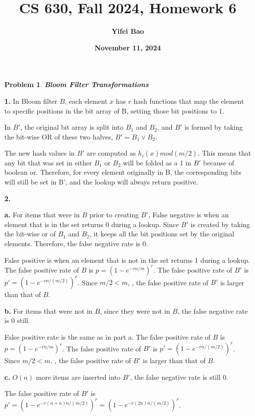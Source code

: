 \documentclass[11pt]{exam}
\title{\Large{\textbf{CS 630, Fall 2024, Homework 6}}}
\author{\textbf{Yifei Bao}}
\date{\textbf{November 11, 2024}}
\newtheorem{problem}{Problem}
\begin{document}
\maketitle

\begin{problem}
    \textbf{Bloom Filter Transformations} 
\end{problem} 

\noindent\textbf{1.}
In Bloom filter $B$, each element $x$ has $r$ hash functions that map the element to specific positions in the bit array of B, setting those bit positions to 1.

In $B'$, the original bit array is split into $B_1$ and $B_2$, and $B'$ is formed by taking the bit-wise OR of these two halves, $B' = B_1 \lor B_2$.

The new hash values in $B'$ are computed as $h_i(x) mod (m/2)$. This means that any bit that was set in either $B_1$ or $B_2$ will be folded as a 1 in $B'$ because of boolean or. Therefore, for every element originally in B, the corresponding bits will still be set in B', and the lookup will always return positive.

\noindent\textbf{2.}

\noindent\textbf{a.}
For items that were in $B$ prior to creating $B'$,
False negative is when an element that is in the set returns 0 during a lookup. Since $B'$ is created by taking the bit-wise or of $B_1$ and $B_2$, it keeps all the bit positions set by the original elements. Therefore, the false negative rate is 0.

False positive is when an element that is not in the set returns 1 during a lookup. The false positive rate of $B$ is $p = (1 - e^{-rn/m})^r$. The false positive rate of $B'$ is $p' = (1 - e^{-rn/(m/2)})^r$. Since $m/2 < m$, , the false positive rate of $B'$ is larger than that of $B$.

\noindent\textbf{b.}
For items that were not in $B$, since they were not in $B$, the false negative rate is 0 still. 

False positive rate is the same as in part a. The false positive rate of $B$ is $p = (1 - e^{-rn/m})^r$. The false positive rate of $B'$ is $p' = (1 - e^{-rn/(m/2)})^r$. Since $m/2 < m$, , the false positive rate of $B'$ is larger than that of $B$.

\noindent\textbf{c.}
$O(n)$ more items are inserted into $B'$, the false negative rate is still 0. 

The false positive rate of $B'$ is $p' = (1 - e^{-r(n+n)n/(m/2)})^r = (1 - e^{-r(2n)n/(m/2)})^r$.
\end{document}
